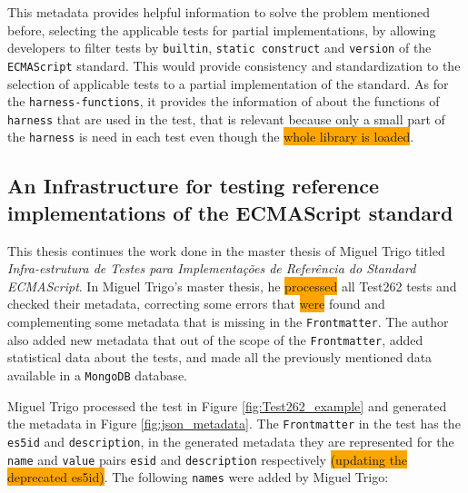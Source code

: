 \documentclass[runningheads]{llncs}
\begin{document}
This metadata provides helpful information to solve the problem mentioned before, selecting the applicable tests for partial implementations, by allowing developers to filter tests by \texttt{builtin}, \texttt{static construct} and \texttt{version} of the \texttt{ECMAScript} standard. This would provide consistency and standardization to the selection of applicable tests to a partial implementation of the standard. As for the \texttt{harness-functions}, it provides the information of about the functions of \texttt{harness} that are used in the test, that is relevant because only a small part of the \texttt{harness} is need in each test even though the \colorbox{orange}{whole library is loaded}.





\subsection{An Infrastructure for testing reference implementations of the ECMAScript standard}
\label{subsec:An Infrastructure for testing reference implementations of the ECMAScript standard}

This thesis continues the work done in the master thesis of Miguel Trigo titled \emph{Infra-estrutura de Testes para Implementações de Referência do Standard ECMAScript}. In Miguel Trigo's master thesis, he \colorbox{orange}{processed} all Test262 tests and checked their metadata,  correcting some errors that \colorbox{orange}{were} found and complementing some metadata that is missing in the \texttt{Frontmatter}. The author also added new metadata that out of the scope of the \texttt{Frontmatter}, added statistical data about the tests, and made all the previously mentioned data available in a \texttt{MongoDB} database.


Miguel Trigo processed the test in Figure \ref{fig:Test262_example} and generated the metadata in Figure \ref{fig:json_metadata}. The \texttt{Frontmatter} in the test has the \texttt{es5id} and \texttt{description}, in the generated metadata they are represented for the \texttt{name} and \texttt{value} pairs \texttt{esid} and \texttt{description} respectively \colorbox{orange}{(updating the deprecated es5id)}.
%
%
The following \texttt{names} were added by Miguel Trigo:
\end{document}
